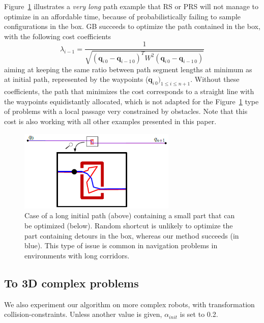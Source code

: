 \documentclass{tADR2e}
\newcommand\conf{\mathbf{q}}
\newcommand\weight{W}
\begin{document}
Figure~\ref{local_box_optim} illustrates a \textit{very long} path example that RS 
or PRS will not manage to 
optimize in an affordable time, because of probabilistically failing to sample 
configurations in the box. GB succeeds to optimize the 
path contained in the box, with the following cost coefficients 
$$
\lambda_{i-1} = \frac{1}{\sqrt{(\conf_{i\,0}-\conf_{i-1\,0})^T \weight^2 
(\conf_{i\,0}-\conf_{i-1\,0})}}
$$
aiming at keeping the same ratio between path segment lengths at 
minimum as at 
initial path, represented by the waypoints ($\conf_{i\,0})_{1\leq i\leq n+1}$.
Without these coefficients, the path that minimizes the cost corresponds to a 
straight line with the waypoints equidistantly allocated, which is not adapted for 
the Figure~\ref{local_box_optim} type of problems with a local passage very
constrained by obstacles. Note that this cost is also working with all other 
examples presented in this paper.


\begin{figure}[t]
	\centering
	\includegraphics[width=7.5cm]{local_box_optim.png}
	\caption{Case of a long initial path (above) containing a small part that can 
	be optimized (below). Random shortcut is unlikely to optimize the part 
	containing detours in the box, whereas our method 
	succeeds (in blue). This type of issue is common in navigation problems in 
	environments with long corridors.}
	\label{local_box_optim}
\end{figure}



\subsection{To 3D complex problems}

We also experiment our algorithm on more complex robots, with transformation 
collision-constraints. Unless another value is given, $\alpha_{init}$ is set to 0.2.

\end{document}
